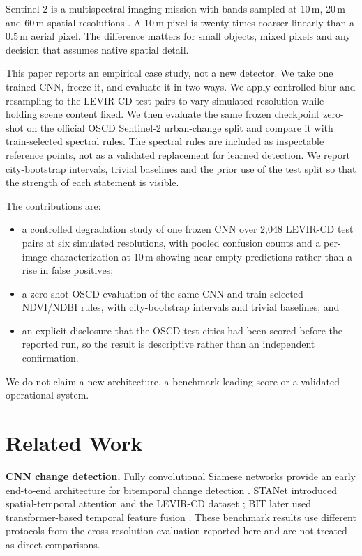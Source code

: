 \documentclass[conference]{IEEEtran}
\begin{document}
Sentinel-2 is a multispectral imaging mission with bands sampled at 10\,m,
20\,m and 60\,m spatial resolutions \cite{drusch2012sentinel,sentinel2mission}.
A 10\,m pixel is twenty times coarser linearly than a 0.5\,m aerial pixel. The
difference matters for small objects, mixed pixels and any decision that
assumes native spatial detail.

This paper reports an empirical case study, not a new detector. We take one
trained CNN, freeze it, and evaluate it in two ways. We apply controlled
blur and resampling to the LEVIR-CD test pairs to vary simulated resolution
while holding scene content fixed. We then evaluate the same frozen
checkpoint zero-shot on the official OSCD Sentinel-2 urban-change split and
compare it with train-selected spectral rules. The spectral rules are included
as inspectable reference points, not as a validated replacement for learned
detection. We report city-bootstrap intervals, trivial baselines and the prior
use of the test split so that the strength of each statement is visible.

The contributions are:
\begin{itemize}
  \item a controlled degradation study of one frozen CNN over 2,048 LEVIR-CD
  test pairs at six simulated resolutions, with pooled confusion counts and a
  per-image characterization at 10\,m showing near-empty predictions rather than
  a rise in false positives;
  \item a zero-shot OSCD evaluation of the same CNN and train-selected
  NDVI/NDBI rules, with city-bootstrap intervals and trivial baselines; and
  \item an explicit disclosure that the OSCD test cities had been scored before
  the reported run, so the result is descriptive rather than an independent
  confirmation.
\end{itemize}
We do not claim a new architecture, a benchmark-leading score or a validated
operational system.

\section{Related Work}
\textbf{CNN change detection.} Fully convolutional Siamese networks provide an
early end-to-end architecture for bitemporal change detection
\cite{daudt2018siamese}. STANet introduced spatial-temporal attention and the
LEVIR-CD dataset \cite{chen2020stanet}; BIT later used transformer-based
temporal feature fusion \cite{chen2022bit}. These benchmark results use
different protocols from the cross-resolution evaluation reported here and
are not treated as direct comparisons.
\end{document}
